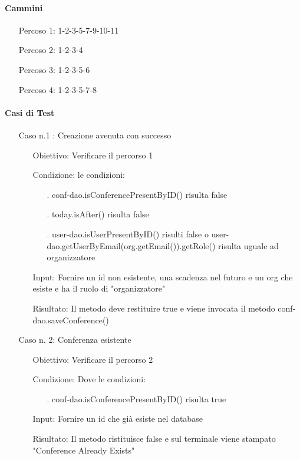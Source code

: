 \paragraph{Cammini}
\begin{itemize}
\item[Percoso 1: ] 1-2-3-5-7-9-10-11
\item[Percoso 2: ] 1-2-3-4
\item[Percoso 3: ] 1-2-3-5-6
\item[Percoso 4: ] 1-2-3-5-7-8
\end{itemize}
\paragraph{Casi di Test}
\begin{itemize}
\item[Caso n.1 :] Creazione avenuta con successo
\begin{itemize}
\item[Obiettivo:] Verificare il percorso 1
\item[Condizione:] le condizioni:
\begin{itemize}
\item[.] conf-dao.isConferencePresentByID() risulta false
\item[.] today.isAfter() risulta false
\item[.] user-dao.isUserPresentByID() risulti false o user-dao.getUserByEmail(org.getEmail()).getRole() risulta uguale ad organizzatore
\end{itemize}
\item[Input:] Fornire un id non esistente, una scadenza nel futuro e un org che esiste e ha il ruolo di "organizzatore"
\item[Risultato:] Il metodo deve restituire true e viene invocata il metodo conf-dao.saveConference()
\end{itemize}
\item[Caso n. 2:] Conferenza esistente
\begin{itemize}
\item[Obiettivo:]  Verificare il percorso 2
\item[Condizione:]  Dove le condizioni:
\begin{itemize}
\item[.] conf-dao.isConferencePresentByID() risulta true
\end{itemize}
\item[Input:] Fornire un id che già esiste nel database
\item[Risultato:] Il metodo ristituisce false e sul terminale viene stampato "Conference Already Exists"

\end{itemize}
\end{itemize}
